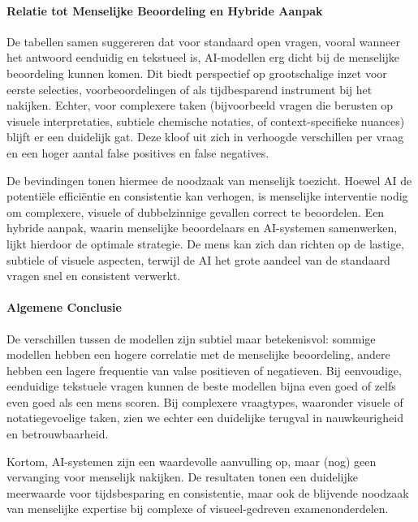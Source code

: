 \documentclass[12pt]{article}
\begin{document}
\begin{multicols}{2}
\paragraph{Relatie tot Menselijke Beoordeling en Hybride Aanpak}
De tabellen samen suggereren dat voor standaard open vragen, vooral wanneer het antwoord eenduidig en tekstueel is, AI-modellen erg dicht bij de menselijke beoordeling kunnen komen. Dit biedt perspectief op grootschalige inzet voor eerste selecties, voorbeoordelingen of als tijdbesparend instrument bij het nakijken. Echter, voor complexere taken (bijvoorbeeld vragen die berusten op visuele interpretaties, subtiele chemische notaties, of context-specifieke nuances) blijft er een duidelijk gat. Deze kloof uit zich in verhoogde verschillen per vraag en een hoger aantal false positives en false negatives.

De bevindingen tonen hiermee de noodzaak van menselijk toezicht. Hoewel AI de potentiële efficiëntie en consistentie kan verhogen, is menselijke interventie nodig om complexere, visuele of dubbelzinnige gevallen correct te beoordelen. Een hybride aanpak, waarin menselijke beoordelaars en AI-systemen samenwerken, lijkt hierdoor de optimale strategie. De mens kan zich dan richten op de lastige, subtiele of visuele aspecten, terwijl de AI het grote aandeel van de standaard vragen snel en consistent verwerkt.

\paragraph*{Algemene Conclusie}
De verschillen tussen de modellen zijn subtiel maar betekenisvol: sommige modellen hebben een hogere correlatie met de menselijke beoordeling, andere hebben een lagere frequentie van valse positieven of negatieven. Bij eenvoudige, eenduidige tekstuele vragen kunnen de beste modellen bijna even goed of zelfs even goed als een mens scoren. Bij complexere vraagtypes, waaronder visuele of notatiegevoelige taken, zien we echter een duidelijke terugval in nauwkeurigheid en betrouwbaarheid.

Kortom, AI-systemen zijn een waardevolle aanvulling op, maar (nog) geen vervanging voor menselijk nakijken. De resultaten tonen een duidelijke meerwaarde voor tijdsbesparing en consistentie, maar ook de blijvende noodzaak van menselijke expertise bij complexe of visueel-gedreven examenonderdelen.


\end{multicols}
\end{document}
